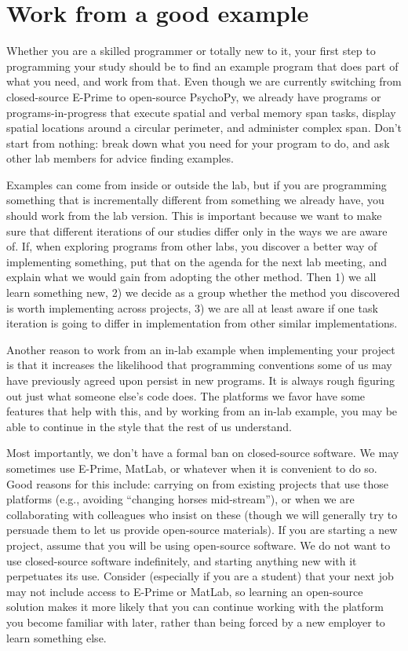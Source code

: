 \documentclass[12pt,]{book}
\theoremstyle{definition}
\theoremstyle{definition}
\theoremstyle{definition}
\theoremstyle{remark}
\begin{document}
\section{Work from a good example}\label{work-from-a-good-example}

Whether you are a skilled programmer or totally new to it, your first
step to programming your study should be to find an example program that
does part of what you need, and work from that. Even though we are
currently switching from closed-source E-Prime to open-source PsychoPy,
we already have programs or programs-in-progress that execute spatial
and verbal memory span tasks, display spatial locations around a
circular perimeter, and administer complex span. Don't start from
nothing: break down what you need for your program to do, and ask other
lab members for advice finding examples.

Examples can come from inside or outside the lab, but if you are
programming something that is incrementally different from something we
already have, you should work from the lab version. This is important
because we want to make sure that different iterations of our studies
differ only in the ways we are aware of. If, when exploring programs
from other labs, you discover a better way of implementing something,
put that on the agenda for the next lab meeting, and explain what we
would gain from adopting the other method. Then 1) we all learn
something new, 2) we decide as a group whether the method you discovered
is worth implementing across projects, 3) we are all at least aware if
one task iteration is going to differ in implementation from other
similar implementations.

Another reason to work from an in-lab example when implementing your
project is that it increases the likelihood that programming conventions
some of us may have previously agreed upon persist in new programs. It
is always rough figuring out just what someone else's code does. The
platforms we favor have some features that help with this, and by
working from an in-lab example, you may be able to continue in the style
that the rest of us understand.

Most importantly, we don't have a formal ban on closed-source software.
We may sometimes use E-Prime, MatLab, or whatever when it is convenient
to do so. Good reasons for this include: carrying on from existing
projects that use those platforms (e.g., avoiding ``changing horses
mid-stream''), or when we are collaborating with colleagues who insist
on these (though we will generally try to persuade them to let us
provide open-source materials). If you are starting a new project,
assume that you will be using open-source software. We do not want to
use closed-source software indefinitely, and starting anything new with
it perpetuates its use. Consider (especially if you are a student) that
your next job may not include access to E-Prime or MatLab, so learning
an open-source solution makes it more likely that you can continue
working with the platform you become familiar with later, rather than
being forced by a new employer to learn something else.
\end{document}
